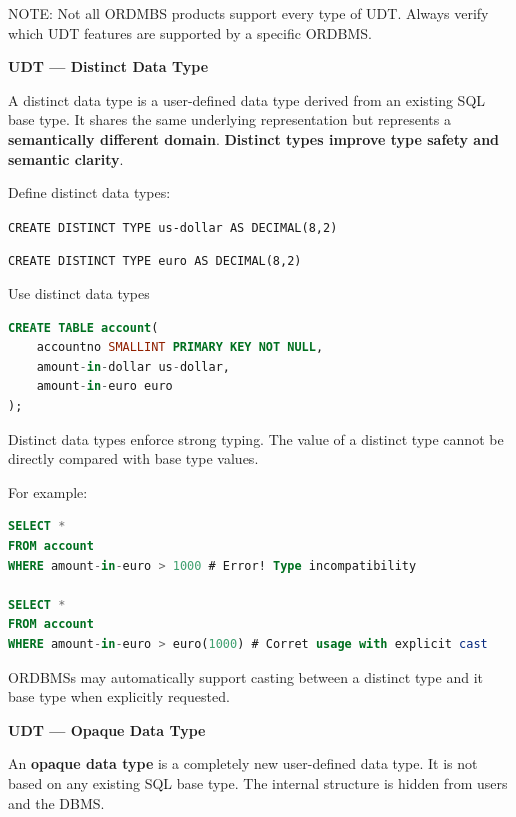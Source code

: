 \documentclass[11pt]{article}
\newenvironment{aside}
  {\begin{mdframed}[style=0,%
      leftline=false,rightline=false,leftmargin=2em,rightmargin=2em,%
          innerleftmargin=0pt,innerrightmargin=0pt,linewidth=0.75pt,%
      skipabove=7pt,skipbelow=7pt]\small}
  {\end{mdframed}}
\newcommand{\boldsec}[1]{
    \vspace{11pt}
    \textbf{#1}
    \vspace{11pt}
}
\begin{document}
\begin{aside}
    NOTE: Not all ORDMBS products support every type of UDT. Always verify which UDT features are supported by a specific ORDBMS.
\end{aside}

\vspace{11pt}
\boldsec{UDT --- Distinct Data Type}

A distinct data type is a user-defined data type derived from an existing SQL base type. It shares the same underlying representation but represents a \textbf{semantically different domain}.\textbf{ Distinct types improve type safety and semantic clarity}.

\vspace{11pt}
Define distinct data types:

\texttt{CREATE DISTINCT TYPE us-dollar AS DECIMAL(8,2)}

\texttt{CREATE DISTINCT TYPE euro AS DECIMAL(8,2)}

\vspace{11pt}
Use distinct data types
\vspace{11pt}
\begin{lstlisting}[language=sql, breaklines=true, showstringspaces=false]
CREATE TABLE account(
    accountno SMALLINT PRIMARY KEY NOT NULL,
    amount-in-dollar us-dollar,
    amount-in-euro euro
);
\end{lstlisting}
\vspace{11pt}

Distinct data types enforce strong typing. The value of a distinct type cannot be directly compared with base type values.

For example:
\vspace{11pt}
\begin{lstlisting}[language=sql, breaklines=true, showstringspaces=false]
SELECT *
FROM account
WHERE amount-in-euro > 1000 # Error! Type incompatibility

SELECT *
FROM account
WHERE amount-in-euro > euro(1000) # Corret usage with explicit cast
\end{lstlisting}
\vspace{11pt}

ORDBMSs may automatically support casting between a distinct type and it base type when explicitly requested.

\boldsec{UDT --- Opaque Data Type}

An \textbf{opaque data type} is a completely new user-defined data type. It is not based on any existing SQL base type. The internal structure is hidden from users and the DBMS. 
\end{document}
